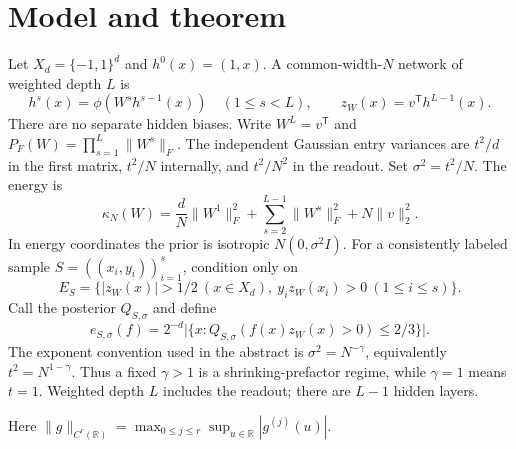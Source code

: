 \documentclass[11pt]{article}
\theoremstyle{remark}\newtheorem{remark}[theorem]{Remark}
\newcommand{\R}{\mathbb R}
\begin{document}
\section{Model and theorem}
Let $X_d=\{-1,1\}^d$ and $h^0(x)=(1,x)$. A common-width-$N$
network of weighted depth $L$ is
\[
 h^s(x)=\phi(W^s h^{s-1}(x))\quad(1\le s<L),\qquad
 z_W(x)=v^{\mathsf T}h^{L-1}(x).
\]
There are no separate hidden biases. Write $W^L=v^{\mathsf T}$
and $P_F(W)=\prod_{s=1}^L\|W^s\|_F$.
The independent Gaussian entry variances are $t^2/d$ in the first
matrix, $t^2/N$ internally, and $t^2/N^2$ in the readout. Set
$\sigma^2=t^2/N$. The energy is
\begin{equation}\label{eq:energy}
 \kappa_N(W)=\frac dN\|W^1\|_F^2+
       \sum_{s=2}^{L-1}\|W^s\|_F^2+N\|v\|_2^2.
\end{equation}
In energy coordinates the prior is isotropic $N(0,\sigma^2 I)$.
For a consistently labeled sample $S=((x_i,y_i))_{i=1}^s$, condition
only on
\begin{equation}\label{eq:event}
 E_S=\{|z_W(x)|>1/2\ (x\in X_d),\
                         y_i z_W(x_i)>0\ (1\le i\le s)\}.
\end{equation}
Call the posterior $Q_{S,\sigma}$ and define
\[
 e_{S,\sigma}(f)=2^{-d}\bigl|\{x:
       Q_{S,\sigma}(f(x)z_W(x)>0)\le2/3\}\bigr|.
\]
The exponent convention used in the abstract is
$\sigma^2=N^{-\gamma}$, equivalently $t^2=N^{1-\gamma}$.
Thus a fixed $\gamma>1$ is a shrinking-prefactor regime, while
$\gamma=1$ means $t=1$. Weighted depth $L$ includes the readout;
there are $L-1$ hidden layers.

Here $\|g\|_{C^r(\R)}=\max_{0\le j\le r}\sup_{u\in\R}|g^{(j)}(u)|$.
\end{document}
